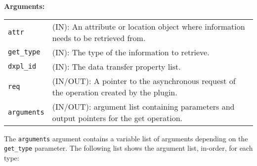 \textbf{Arguments:}\\
\begin{tabular}{l p{10cm}}
  {\tt attr} & (IN): An attribute or location object where information
  needs to be retrieved from.\\
  {\tt get\_type} & (IN): The type of the information to retrieve.\\
  {\tt dxpl\_id} & (IN): The data transfer property list.\\
  {\tt req} & (IN/OUT): A pointer to the asynchronous request of the
  operation created by the plugin.\\
  {\tt arguments} & (IN/OUT): argument list containing parameters and
  output pointers for the get operation. \\
\end{tabular}

The {\tt arguments} argument contains a variable list of arguments
depending on the {\tt get\_type} parameter. The following list shows
the argument list, in-order, for each type:


